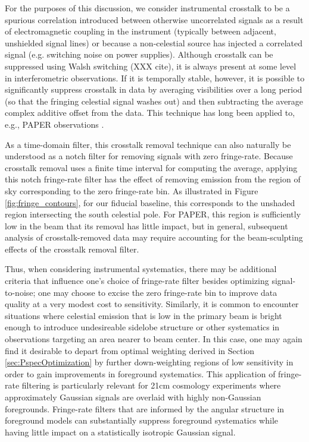 \documentclass[twocolumn,apj,numberedappendix]{emulateapj}
\begin{document}
For the purposes of this discussion, we consider instrumental crosstalk to be a spurious 
correlation introduced between otherwise uncorrelated signals
as a result of electromagnetic coupling in the instrument (typically between adjacent, unshielded signal lines)
or because a non-celestial source has injected a correlated signal (e.g. switching noise on power supplies).
Although crosstalk can be suppressed using Walsh switching (XXX cite), it is always present at some level
in interferometric observations.  If it is temporally stable, however, it is possible to significantly
suppress crosstalk in data by averaging visibilities over a long period (so that the fringing celestial
signal washes out) and then subtracting the average complex additive offset from the data.  This 
technique has
long been applied to, e.g., PAPER observations \citep{parsons_et_al2010,pober_et_al2013,J14,P14,ali_et_al2015}.

As a time-domain filter, this crosstalk removal technique can also naturally be understood as a notch filter
for removing signals with zero fringe-rate.  Because crosstalk removal uses a finite time interval for computing
the average, applying this notch fringe-rate filter has the effect of removing emission from the region of
sky corresponding to the zero fringe-rate bin.  As illustrated in Figure \ref{fig:fringe_contours}, for our
fiducial baseline,
this corresponds to the unshaded region intersecting the south celestial pole.
For PAPER, this region is sufficiently low in the beam that its removal has little impact, but in general, 
subsequent analysis of crosstalk-removed data may require accounting for the beam-sculpting effects of
the crosstalk removal filter.

Thus, when considering instrumental systematics, there may be additional criteria that influence one's
choice of fringe-rate filter besides optimizing signal-to-noise; one may choose to excise the zero fringe-rate
bin to improve data quality at a very modest cost to sensitivity.  Similarly, it is common to encounter situations
where celestial emission that is low in the primary beam is bright enough to introduce undesireable 
sidelobe structure or other systematics in observations targeting an area nearer to beam center.  In this case,
one may again find it desirable to depart from optimal weighting derived in Section \ref{sec:PspecOptimization}
by further down-weighting regions of low sensitivity in order to gain improvements in foreground systematics.
This application of fringe-rate filtering is particularly relevant for 21cm cosmology experiments where approximately
Gaussian signals are overlaid with highly non-Gaussian foregrounds.  Fringe-rate filters that are informed by 
the angular structure in foreground models can substantially suppress foreground systematics while having little
impact on a statistically isotropic Gaussian signal.
\end{document}
